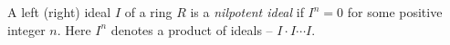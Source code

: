 \documentclass{article}
\begin{document}
A left (right) ideal $I$ of a ring $R$ is a {\it nilpotent ideal} if $I^n = 0$ for some positive integer $n$.  Here $I^n$ denotes a product of ideals -- $I \cdot I \cdots I$.
\end{document}
